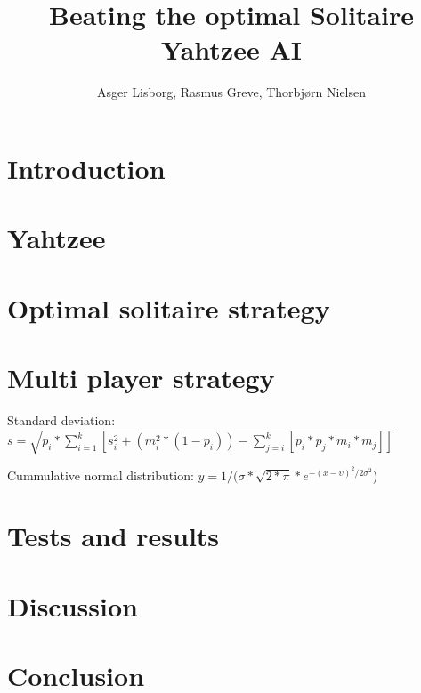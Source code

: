 \documentclass[twocolumn]{article}
\title{Beating the optimal Solitaire Yahtzee AI}
\author{Asger Lisborg, Rasmus Greve, Thorbjørn Nielsen}
\begin{document}
\maketitle

\begin{abstract}

\end{abstract}


\section{Introduction}


\section{Yahtzee}


\section{Optimal solitaire strategy}

\label{sec:optimalSingleAI}

\section{Multi player strategy}

\label{sec:subOptimalMPAI}

Standard deviation: $s = \sqrt{p_i * \sum_{i=1}^{k} \left[s_i^2 + (m_i^2 * (1 - p_i)) - \sum_{j=i}^{k} \left[p_i * p_j * m_i * m_j\right]\right]}$

Cummulative normal distribution: $y = 1 /(\sigma * \sqrt{2 * \pi} * e^{-(x - \upsilon)^2 / 2 \sigma^2}$)

\section{Tests and results}

\label{sec:testsAndResults}


\section{Discussion}


\section{Conclusion}





\end{document}
